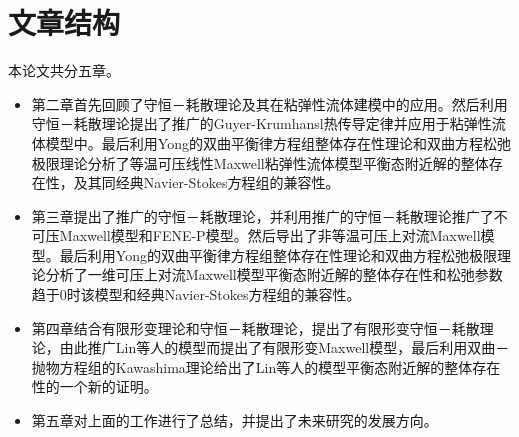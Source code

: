 \section{文章结构}
本论文共分五章。
\begin{itemize}
\item 第二章首先回顾了守恒－耗散理论及其在粘弹性流体建模中的应用。然后利用守恒－耗散理论提出了推广的Guyer-Krumhansl热传导定律并应用于粘弹性流体模型中。最后利用Yong的双曲平衡律方程组整体存在性理论和双曲方程松弛极限理论分析了等温可压线性Maxwell粘弹性流体模型平衡态附近解的整体存在性，及其同经典Navier-Stokes方程组的兼容性。
\item 第三章提出了推广的守恒－耗散理论，并利用推广的守恒－耗散理论推广了不可压Maxwell模型和FENE-P模型。然后导出了非等温可压上对流Maxwell模型。最后利用Yong的双曲平衡律方程组整体存在性理论和双曲方程松弛极限理论分析了一维可压上对流Maxwell模型平衡态附近解的整体存在性和松弛参数趋于$0$时该模型和经典Navier-Stokes方程组的兼容性。
\item 第四章结合有限形变理论和守恒－耗散理论，提出了有限形变守恒－耗散理论，由此推广Lin等人的模型而提出了有限形变Maxwell模型，最后利用双曲－抛物方程组的Kawashima理论给出了Lin等人的模型平衡态附近解的整体存在性的一个新的证明。
\item 第五章对上面的工作进行了总结，并提出了未来研究的发展方向。
\end{itemize}






